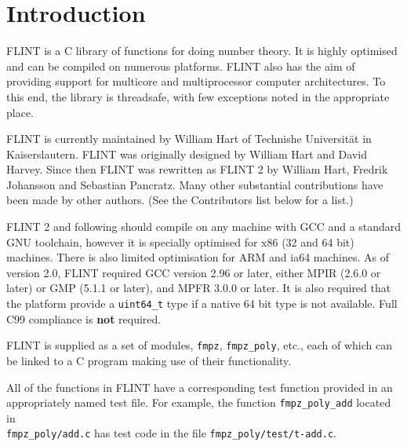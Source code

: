 \documentclass[a4paper,10pt]{book}
\newcommand{\code}{\lstinline}
\begin{document}

\frontmatter


\clearpage

\tableofcontents


\mainmatter

\chapter{Introduction}

FLINT is a C library of functions for doing number theory. It is highly
optimised and can be compiled on numerous platforms.  FLINT also has the
aim of providing support for multicore and multiprocessor computer
architectures. To this end, the library is threadsafe, with few exceptions
noted in the appropriate place.

FLINT is currently maintained by William Hart of Technishe Universit\"{a}t
in Kaiserslautern. FLINT was originally designed by William Hart and David
Harvey. Since then FLINT was rewritten as FLINT 2 by William Hart, Fredrik
Johansson and Sebastian Pancratz. Many other substantial contributions have
been made by other authors. (See the Contributors list below for a list.)

FLINT 2 and following should compile on any machine with GCC and a standard
GNU toolchain, however it is specially optimised for x86 (32 and 64 bit)
machines. There is also limited optimisation for ARM and ia64 machines. As
of version 2.0, FLINT required GCC version 2.96 or later, either MPIR
(2.6.0 or later) or GMP (5.1.1 or later), and MPFR 3.0.0 or later.
It is also required that the platform
provide a \code{uint64_t} type if a native 64 bit type is not available.
Full C99 compliance is \textbf{not} required.

FLINT is supplied as a set of modules, \code{fmpz}, \code{fmpz_poly}, etc.,
each of which can be linked to a C program making use of their functionality.

All of the functions in FLINT have a corresponding test function provided
in an appropriately named test file.  For example, the function
\code{fmpz_poly_add} located in\\ \code{fmpz_poly/add.c} has test code in the
file \code{fmpz_poly/test/t-add.c}.
\end{document}
